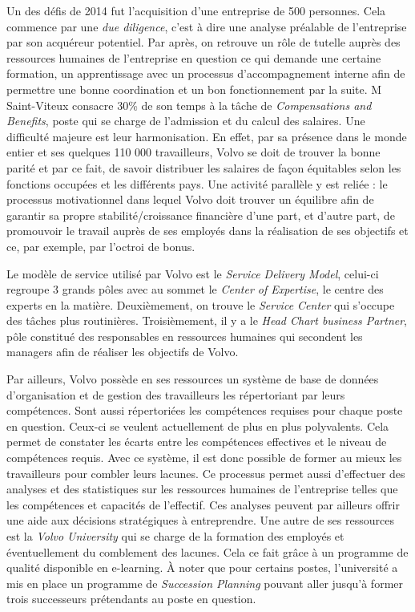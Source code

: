 \documentclass[a4paper, 12pt]{article}
\begin{document}
Un des défis de 2014 fut l'acquisition d'une entreprise de 500 personnes. Cela commence par une \textit{due diligence}, c'est à dire une analyse préalable de l'entreprise par son acquéreur potentiel. Par après, on retrouve un rôle de tutelle auprès des ressources humaines de l'entreprise en question ce qui demande une certaine formation, un apprentissage avec un processus d'accompagnement interne afin de permettre une bonne coordination et un bon fonctionnement par la suite.
M Saint-Viteux consacre 30\% de son temps à la tâche de \textit{Compensations and Benefits}, poste qui se charge de l'admission et du calcul des salaires. Une difficulté majeure est leur harmonisation. En effet, par sa présence dans le monde entier et ses quelques 110 000 travailleurs, Volvo se doit de trouver la bonne parité et par ce fait, de savoir distribuer les salaires de façon équitables selon les fonctions occupées et les différents pays.                   	            	     
Une activité parallèle y est reliée : le processus motivationnel dans lequel Volvo doit  trouver un équilibre afin de garantir sa propre stabilité/croissance financière d'une part, et d'autre part, de promouvoir le travail auprès de ses employés dans la réalisation de ses objectifs et ce, par exemple, par l'octroi de bonus.

Le modèle de service utilisé par Volvo est le \textit{Service Delivery Model}, celui-ci regroupe 3 grands pôles avec au sommet le \textit{Center of Expertise}, le centre des experts en la matière. Deuxièmement, on trouve le \textit{Service Center} qui s'occupe des tâches plus routinières. Troisièmement, il y a le \textit{Head Chart business Partner}, pôle constitué des responsables en ressources humaines qui secondent les managers afin de réaliser les objectifs de Volvo.  

Par ailleurs, Volvo possède en ses ressources un système de base de données d'organisation et de gestion des travailleurs les répertoriant par leurs compétences. Sont aussi répertoriées les compétences requises pour chaque poste en question. Ceux-ci se veulent actuellement de plus en plus polyvalents. Cela permet de constater les écarts entre les compétences effectives et le niveau de compétences requis.  Avec ce système, il est donc possible de former au mieux les travailleurs pour combler leurs lacunes. Ce processus permet aussi d'effectuer des analyses et des statistiques sur les ressources humaines de l'entreprise telles que les compétences et capacités de l'effectif. Ces analyses peuvent par ailleurs offrir une aide aux décisions stratégiques à entreprendre. Une autre de ses ressources est la \textit{Volvo University} qui se charge de la formation des employés et éventuellement du comblement des lacunes. Cela ce fait grâce à un programme de qualité disponible en e-learning. À noter que pour certains postes, l'université a mis en place un programme de \textit{Succession Planning} pouvant aller jusqu'à former trois successeurs prétendants au poste en question.
\end{document}

